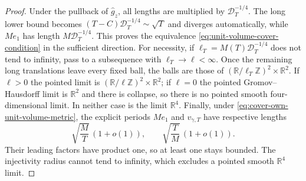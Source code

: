 \documentclass[11pt]{article}
\numberwithin{equation}{section}
\theoremstyle{definition}
\theoremstyle{remark}
\newcommand{\R}{\mathbb R}
\newcommand{\Z}{\mathbb Z}
\begin{document}
\begin{proof}
Under the pullback of $\widehat g_z$, all lengths are multiplied by
$\mathcal D_T^{-1/4}$.  The long lower bound becomes
$(T-C)\mathcal D_T^{-1/4}\sim\sqrt T$ and diverges automatically, while
$Me_1$ has length $M\mathcal D_T^{-1/4}$.  This proves the equivalence
\eqref{eq:unit-volume-cover-condition} in the sufficient direction.  For
necessity, if $\ell_T=M(T)\mathcal D_T^{-1/4}$ does not tend to infinity,
pass to a subsequence with $\ell_T\to\ell<\infty$.  Once the remaining long
translations leave every fixed ball, the balls are those of
$(\R/\ell_T\Z)^2\times\R^2$.  If $\ell>0$ the pointed limit is
$(\R/\ell\Z)^2\times\R^2$; if $\ell=0$ the pointed
Gromov--Hausdorff limit is $\R^2$ and there is collapse, so there is no
pointed smooth four-dimensional limit.  In neither case is the limit $\R^4$.
Finally, under
\eqref{eq:cover-own-unit-volume-metric}, the explicit periods $Me_1$ and
$v_{\gamma,T}$ have respective lengths
\begin{equation}\label{eq:cover-own-unit-volume-lengths}
 \sqrt{\frac MT}\,(1+o(1)),\qquad
 \sqrt{\frac TM}\,(1+o(1)).
\end{equation}
Their leading factors have product one, so at least one stays bounded.  The
injectivity radius cannot tend to infinity, which excludes a pointed smooth
$\R^4$ limit.
\end{proof}
\end{document}
